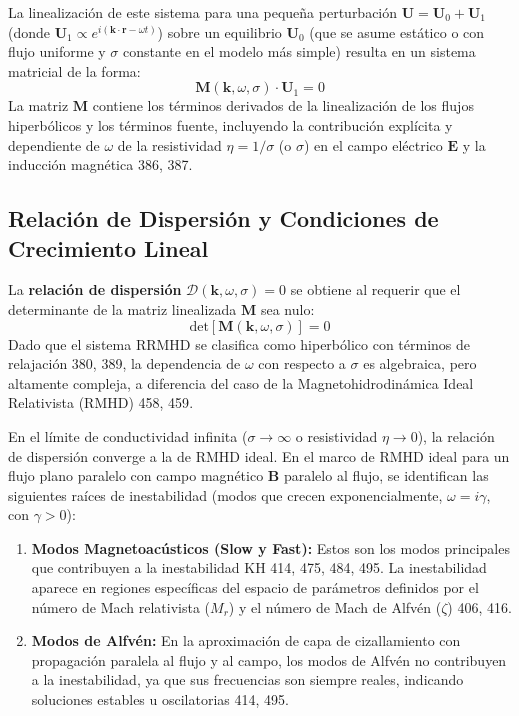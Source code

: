 La linealización de este sistema para una pequeña perturbación $\mathbf{U} = \mathbf{U}_0 + \mathbf{U}_1$ (donde $\mathbf{U}_1 \propto e^{i(\mathbf{k} \cdot \mathbf{r} - \omega t)}$) sobre un equilibrio $\mathbf{U}_0$ (que se asume estático o con flujo uniforme y $\sigma$ constante en el modelo más simple) resulta en un sistema matricial de la forma:
\begin{equation}
\label{eq:RRMHD_linearized_matrix}
\mathbf{M}(\mathbf{k}, \omega, \sigma) \cdot \mathbf{U}_1 = 0
\end{equation}
La matriz $\mathbf{M}$ contiene los términos derivados de la linealización de los flujos hiperbólicos y los términos fuente, incluyendo la contribución explícita y dependiente de $\omega$ de la resistividad $\eta = 1/\sigma$ (o $\sigma$) en el campo eléctrico $\mathbf{E}$ y la inducción magnética {386, 387}.

\subsection{Relación de Dispersión y Condiciones de Crecimiento Lineal}

La \textbf{relación de dispersión} $\mathcal{D}(\mathbf{k}, \omega, \sigma) = 0$ se obtiene al requerir que el determinante de la matriz linealizada $\mathbf{M}$ sea nulo:
\begin{equation}
\label{eq:dispersion_relation}
\text{det}[\mathbf{M}(\mathbf{k}, \omega, \sigma)] = 0
\end{equation}
Dado que el sistema RRMHD se clasifica como hiperbólico con términos de relajación {380, 389}, la dependencia de $\omega$ con respecto a $\sigma$ es algebraica, pero altamente compleja, a diferencia del caso de la Magnetohidrodinámica Ideal Relativista (RMHD) {458, 459}.

En el límite de conductividad infinita ($\sigma \to \infty$ o resistividad $\eta \to 0$), la relación de dispersión converge a la de RMHD ideal. En el marco de RMHD ideal para un flujo plano paralelo con campo magnético $\mathbf{B}$ paralelo al flujo, se identifican las siguientes raíces de inestabilidad (modos que crecen exponencialmente, $\omega = i \gamma$, con $\gamma > 0$):

\begin{enumerate}
    \item \textbf{Modos Magnetoacústicos (Slow y Fast):} Estos son los modos principales que contribuyen a la inestabilidad KH {414, 475, 484, 495}. La inestabilidad aparece en regiones específicas del espacio de parámetros definidos por el número de Mach relativista ($M_r$) y el número de Mach de Alfvén ($\zeta$) {406, 416}.
    \item \textbf{Modos de Alfvén:} En la aproximación de capa de cizallamiento con propagación paralela al flujo y al campo, los modos de Alfvén no contribuyen a la inestabilidad, ya que sus frecuencias son siempre reales, indicando soluciones estables u oscilatorias {414, 495}.
\end{enumerate}

